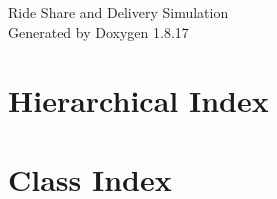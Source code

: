 \let\mypdfximage\pdfximage\def\pdfximage{\immediate\mypdfximage}\documentclass[twoside]{book}
\newcommand{\+}{\discretionary{\mbox{\scriptsize$\hookleftarrow$}}{}{}}
\newcommand{\clearemptydoublepage}{%
  \newpage{\pagestyle{empty}\cleardoublepage}%
}
\begin{document}
\hypersetup{pageanchor=false,
             bookmarksnumbered=true,
             pdfencoding=unicode
            }
\begin{titlepage}
\vspace*{7cm}
\begin{center}%
{\Large Ride Share and Delivery Simulation }\\
\vspace*{1cm}
{\large Generated by Doxygen 1.8.17}\\
\end{center}
\end{titlepage}
\clearemptydoublepage
{}
\tableofcontents
\clearemptydoublepage
{}
\hypersetup{pageanchor=true}

\chapter{Hierarchical Index}

\chapter{Class Index}

\end{document}
